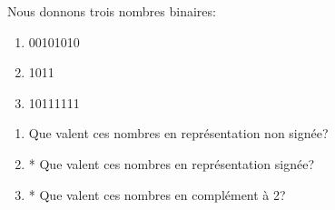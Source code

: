 \documentclass[11pt, a4paper]{book}
\begin{document}
\begin{exercice}

Nous donnons trois nombres binaires:
\begin{enumerate}[1)]
\item 00101010
\item 1011
\item 10111111
\end{enumerate}

\begin{enumerate}
\item Que valent ces nombres en représentation non signée?
\item * Que valent ces nombres en représentation signée?
\item * Que valent ces nombres en complément à 2?
\end{enumerate}

\end{exercice}
\end{document}
